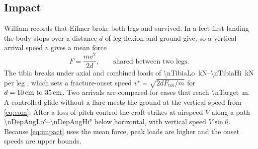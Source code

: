 \subsection{Impact}

William records that Eilmer broke both legs and survived.
In a feet-first landing the body stops over a distance \(d\) of leg flexion and ground
give, so a vertical arrival speed \(v\) gives a mean force
\begin{equation}
  F = \frac{m v^2}{2 d}, \qquad \text{shared between two legs.}
  \label{eq:impact}
\end{equation}
The tibia breaks under axial and combined loads of \SIrange{\nTibiaLo}{\nTibiaHi}{\kilo\newton}
per leg \autocite{salzar2014leg,abidin2026tibia,forman2012femur,ivarsson2005bending,femurFE2022},
which sets a fracture-onset speed \(v^\star = \sqrt{2 d F_\mathrm{tot}/m}\) for
\(d = \SIrange{\nStopLo}{\nStopHi}{\centi\meter}\).
Two arrivals are compared for cases that reach \SI{\nTarget}{\meter}.
A controlled glide without a flare meets the ground at the vertical speed from
\cref{eq:eom}.
After a loss of pitch control the craft strikes at airspeed \(V\) along a path
\ang{\nDepAngLo}--\ang{\nDepAngHi} below horizontal, with vertical speed \(V\sin\theta\).
Because \cref{eq:impact} uses the mean force, peak loads are higher and the onset speeds are
upper bounds.
